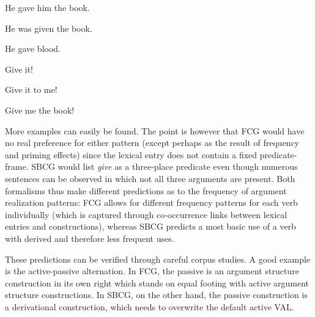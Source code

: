 \ea
He gave him the book.
\item He was given the book.
\item He gave blood.
\item Give it!
\item Give it to me!
\item Give me the book!
\z

More examples can easily be found. The point is however that FCG would have no real preference for either pattern (except perhaps as the result of frequency and priming effects) since the lexical entry does not contain a fixed predicate-frame. SBCG would list {\em give} as a three-place predicate even though numerous sentences can be observed in which not all three arguments are present. Both formalisms thus make different predictions as to the frequency of argument realization patterns: FCG allows for different frequency patterns for each verb individually (which is captured through co-occurrence links between lexical entries and constructions), whereas SBCG predicts a most basic use of a verb with derived and therefore less frequent uses.

These predictions can be verified through careful corpus studies. A good example is the active-passive alternation. In FCG, the passive is an argument structure construction in its own right which stands on equal footing with active argument structure constructions. In SBCG, on the other hand, the passive construction is a derivational construction, which needs to overwrite the default active VAL.

